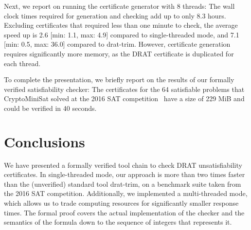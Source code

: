 \documentclass{llncs}
\begin{document}
Next, we report on running the certificate generator with 8 threads: The wall clock times required for generation and checking add up to only 8.3 hours.
Excluding certificates that required less than one minute to check, the average speed up is 2.6 [min: 1.1, max: 4.9] compared to single-threaded mode, 
and 7.1 [min: 0.5, max: 36.0] compared to drat-trim.
However, certificate generation requires significantly more memory, as the DRAT certificate is duplicated for each thread.
 


To complete the presentation, we briefly report on the results of our formally verified satisfiability checker:
The certificates for the 64 satisfiable problems that CryptoMiniSat solved at the 2016 SAT competition~\cite{satcomp-2016} have a size of 229 MiB and could be verified in 40 seconds.

\section{Conclusions}\label{sec:concl}
We have presented a formally verified tool chain to check DRAT unsatisfiability certificates. 
In single-threaded mode, our approach is more than two times faster than the (unverified) standard tool drat-trim, on a benchmark 
suite taken from the 2016 SAT competition. Additionally, we implemented a multi-threaded mode, 
which allows us to trade computing resources for significantly smaller response times.
The formal proof covers the actual implementation of the checker and the semantics of the 
formula down to the sequence of integers that represents it.
\end{document}
